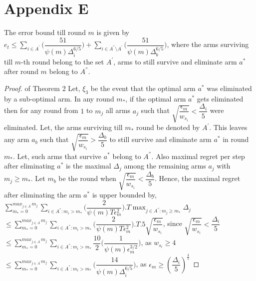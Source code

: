 \section*{Appendix E}
\begin{theorem}
The error bound till round $m$ is given by $e_{t}\leq \sum_{i\in A^{'}}\bigg(\dfrac{51}{\psi(m)\Delta_{i}^{6/5}} \bigg)+\sum_{i\in A^{''}\setminus A^{'}}\bigg(\dfrac{51}{\psi(m)\Delta_{b}^{6/5}} \bigg)$, where the arms surviving till $m$-th round belong to the set $A^{'}$, arms to still survive and eliminate arm $a^{*}$ after round $m$ belong to $A^{''}$.
\end{theorem}
\begin{proof} of Theorem 2
\newline
Let,  $\xi_{3}$ be the event that the optimal arm $a^{*}$ was eliminated by a sub-optimal arm. In any round $m_{*}$, if the optimal arm $a^{*}$ gets eliminated then for any round from $1$ to $m_{j}$ all arms $a_{j}$ such that $\sqrt{\dfrac{\epsilon_{m}}{w_{s_{i}}}}<\dfrac{\Delta_{i}}{5}$ were eliminated. Let, the arms surviving till $m_{*}$ round be denoted by $A^{'}$. This leaves any arm $a_{b}$ such that $\sqrt{\dfrac{\epsilon_{m}}{w_{s_{i}}}}>\dfrac{\Delta_{b}}{5}$ to still survive and eliminate arm $a^{*}$ in round $m_{*}$. Let, such arms that survive $a^{*}$ belong to $A^{''}$. Also maximal regret per step after eliminating $a^{*}$ is the maximal $\Delta_{j}$ among the remaining arms $a_{j}$ with $m_{j}\geq m_{*}$.  Let $m_{b}$ be the round when $\sqrt{\dfrac{\epsilon_{m}}{w_{s_{i}}}}<\dfrac{\Delta_{b}}{5}$. Hence, the maximal regret after eliminating the arm $a^{*}$ is upper bounded by, 
\newline
$\sum_{m_{*}=0}^{max_{j\in A^{'}}m_{j}}\sum_{i\in A^{''}:m_{i}>m_{*}}\bigg(\dfrac{2}{\psi(m)T\epsilon_{m}^{2}} \bigg).T\max_{j\in A^{''}:m_{j}\geq m_{*}}{\Delta}_{j}$
\newline
\hspace*{0em}$\leq\sum_{m_{*}=0}^{max_{j\in A^{'}}m_{j}}\sum_{i\in A^{''}:m_{i}>m_{*}}\bigg(\dfrac{2}{\psi(m)T\epsilon_{m}^{2}} \bigg).T.5\sqrt{\dfrac{\epsilon_{m}}{w_{s_{i}}}}$, since $\sqrt{\dfrac{\epsilon_{m}}{w_{s_{i}}}}<\dfrac{\Delta_{i}}{5}$
\newline
\hspace*{0em}$\leq\sum_{m_{*}=0}^{max_{j\in A^{'}}m_{j}}\sum_{i\in A^{''}:m_{i}>m_{*}}\dfrac{10}{2}\bigg(\dfrac{1}{\psi(m)\epsilon_{m}^{3/2}} \bigg) $, as $w_{s_{i}}\geq 4$
\newline
\hspace*{0em}$\leq\sum_{m_{*}=0}^{max_{j\in A^{'}}m_{j}}\sum_{i\in A^{''}:m_{i}>m_{*}}\bigg(\dfrac{14}{\psi(m)\Delta_{i}^{6/5}} \bigg) $, as $\epsilon_{m}\geq(\dfrac{\Delta_{i}}{5})^{\frac{4}{5}}$

\end{proof}
